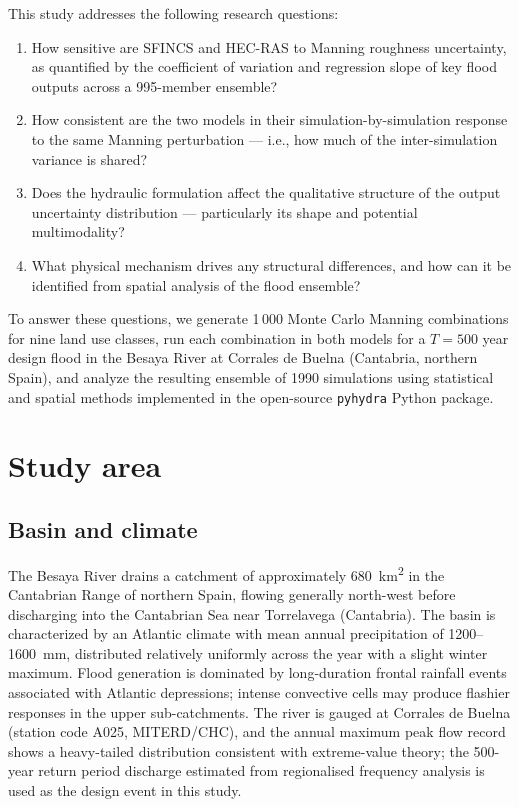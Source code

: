 \documentclass[review,12pt]{elsarticle}
\newcommand{\sfincs}{\textsc{SFINCS}}
\newcommand{\hecras}{\textsc{HEC-RAS}}
\begin{document}
This study addresses the following research questions:
\begin{enumerate}
  \item How sensitive are \sfincs{} and \hecras{} to Manning roughness
        uncertainty, as quantified by the coefficient of variation and
        regression slope of key flood outputs across a 995-member ensemble?
  \item How consistent are the two models in their simulation-by-simulation
        response to the same Manning perturbation --- i.e., how much of the
        inter-simulation variance is shared?
  \item Does the hydraulic formulation affect the qualitative structure of
        the output uncertainty distribution --- particularly its shape and
        potential multimodality?
  \item What physical mechanism drives any structural differences, and how
        can it be identified from spatial analysis of the flood ensemble?
\end{enumerate}

To answer these questions, we generate 1\,000 Monte Carlo Manning combinations
for nine land use classes, run each combination in both models for a $T = 500$
year design flood in the Besaya River at Corrales de Buelna (Cantabria,
northern Spain), and analyze the resulting ensemble of \num{1990} simulations
using statistical and spatial methods implemented in the open-source
\texttt{pyhydra} Python package.

\section{Study area}
\label{sec:area}

\subsection{Basin and climate}
\label{sec:basin}

The Besaya River drains a catchment of approximately 680~km\textsuperscript{2}
in the Cantabrian Range of northern Spain, flowing generally north-west
before discharging into the Cantabrian Sea near Torrelavega (Cantabria).
The basin is characterized by an Atlantic climate with mean annual precipitation
of 1200--1600~mm, distributed relatively uniformly across the year with a
slight winter maximum.
Flood generation is dominated by long-duration frontal rainfall events
associated with Atlantic depressions; intense convective cells may produce
flashier responses in the upper sub-catchments.
The river is gauged at Corrales de Buelna (station code A025, MITERD/CHC),
and the annual maximum peak flow record shows a heavy-tailed distribution
consistent with extreme-value theory; the 500-year return period discharge
estimated from regionalised frequency analysis is used as the design event
in this study.
\end{document}
